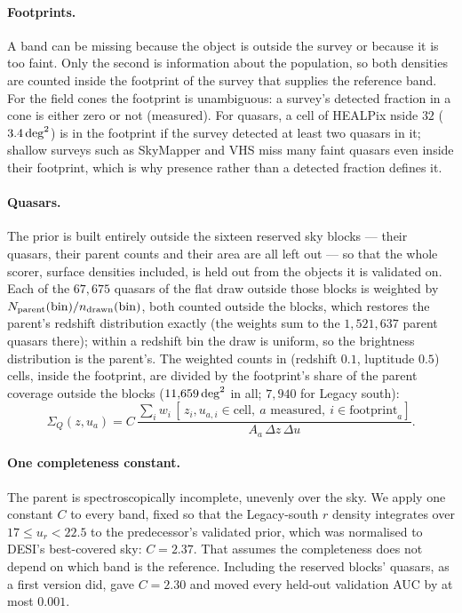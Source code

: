 \documentclass[11pt,a4paper]{article}
\newcommand{\Sq}{\Sigma_{Q}}
\begin{document}
\paragraph{Footprints.} A band can be missing because the object is outside the
survey or because it is too faint. Only the second is information about the
population, so both densities are counted inside the footprint of the survey
that supplies the reference band. For the field cones the footprint is
unambiguous: a survey's detected fraction in a cone is either zero or not
(measured). For quasars, a cell of HEALPix nside $32$ ($3.4\,{\rm deg}^2$) is in
the footprint if the survey detected at least two quasars in it; shallow
surveys such as SkyMapper and VHS miss many faint quasars even inside their
footprint, which is why presence rather than a detected fraction defines it.

\paragraph{Quasars.} The prior is built entirely outside the sixteen reserved
sky blocks --- their quasars, their parent counts and their area are all left
out --- so that the whole scorer, surface densities included, is held out from
the objects it is validated on. Each of the $67{,}675$ quasars of the flat draw
outside those blocks is weighted by $N_{\rm parent}(\text{bin})/n_{\rm
drawn}(\text{bin})$, both counted outside the blocks, which restores the
parent's redshift distribution exactly (the weights sum to the $1{,}521{,}637$
parent quasars there); within a redshift bin the draw is uniform, so the
brightness distribution is the parent's. The weighted counts in (redshift
$0.1$, luptitude $0.5$) cells, inside the footprint, are divided by the
footprint's share of the parent coverage outside the blocks
($11{,}659\,{\rm deg}^2$ in all; $7{,}940$ for Legacy south):
%
\begin{equation}
\Sq(z,u_a) = C\,\frac{\sum_i w_i\,[\,z_i,u_{a,i}\in\text{cell},\ a\text{ measured},\
             i\in\text{footprint}_a]}{A_a\,\Delta z\,\Delta u}.
\label{eq:sigma_q}
\end{equation}

\paragraph{One completeness constant.} The parent is spectroscopically
incomplete, unevenly over the sky. We apply one constant $C$ to every band,
fixed so that the Legacy-south $r$ density integrates over $17\le u_r<22.5$ to
the predecessor's validated prior, which was normalised to DESI's best-covered
sky: $C=2.37$. That assumes the completeness does not depend on which band is the
reference. Including the reserved blocks' quasars, as a first version did, gave
$C=2.30$ and moved every held-out validation AUC by at most $0.001$.
\end{document}
